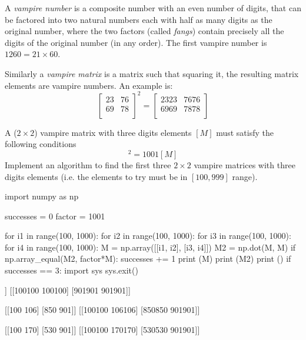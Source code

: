 \cprotEnv\begin{question}
A \emph{vampire number} is a composite number with an even number of digits, that can be factored into two natural numbers each with half as many digits as the original number, where the two factors (called \emph{fangs}) contain precisely all the digits of the original number (in any order). The first vampire number is $1260 = 21 \times 60$.

Similarly a \emph{vampire matrix} is a matrix such that squaring it, the resulting matrix elements are vampire numbers. An example is:
\begin{equation*}
\begin{bmatrix}
23 & 76 \\
69 & 78 \\
\end{bmatrix}^{2} =
\begin{bmatrix}
2323 & 7676 \\
6969 & 7878 \\
\end{bmatrix}
\end{equation*}

A ($2\times 2$) vampire matrix with three digits elements $[M]$ must satisfy the following conditions
\begin{equation*}
[M]^2 = 1001 [M]
\end{equation*}
\noindent
Implement an algorithm to find the first three $2\times 2$ vampire matrices with three digits elements (i.e. the elements to try must be in $[100,999]$ range). 
\end{question}
\cprotEnv\begin{solution}
\begin{ipython}
import numpy as np

successes = 0
factor = 1001

for i1 in range(100, 1000):
    for i2 in range(100, 1000):
        for i3 in range(100, 1000):
            for i4 in range(100, 1000):
                M = np.array([[i1, i2], [i3, i4]])
                M2 = np.dot(M, M)
                if np.array_equal(M2, factor*M):
                    successes += 1
                    print (M)
                    print (M2)
                    print ()
                    if successes == 3:
                        import sys
                        sys.exit()
\end{ipython}
\begin{ioutput}
[[100 100]
 [901 901]]
[[100100 100100]
 [901901 901901]]

[[100 106]
 [850 901]]
[[100100 106106]
 [850850 901901]]

[[100 170]
 [530 901]]
[[100100 170170]
 [530530 901901]]
\end{ioutput}
\end{solution}

